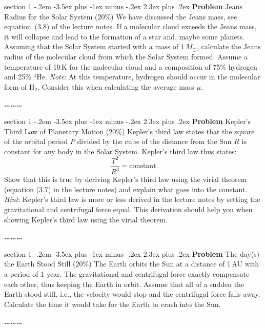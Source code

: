 \documentclass[letterpaper,12pt,twoside=false,DIV=11]{scrartcl}
\makeatletter
\newenvironment{problem}{\@startsection
    {section}
    {1}
    {-.2em}
    {-3.5ex plus -1ex minus -.2ex}
    {2.3ex plus .2ex}
    {
        \pagebreak[3] %
        \noindent\sffamily\bfseries Problem
    }
}
{
    \begin{center}\large\bfseries\ldots\ldots\ldots\end{center}
}
\providecommand{\ex}[1]{\ensuremath{^{#1}}}
\makeatother
\begin{document}
\begin{problem}{Jeans Radius for the Solar System (20\%)} 
    We have discussed the Jeans mass, see equation~(3.8) of the lecture notes. If a molecular cloud exceeds the Jeans mass, it will collapse and lead to the formation of a star and, maybe some planets. Assuming that the Solar System started with a mass of $1\,M_\odot$, calculate the Jeans radius of the molecular cloud from which the Solar System formed. Assume a temperature of 10\,K for the molecular cloud and a composition of 75\% hydrogen and 25\% \ex{4}He. \emph{Note}: At this temperature, hydrogen should occur in the molecular form of H$_2$. Consider this when calculating the average mass $\mu$.
\end{problem}

\begin{problem}{Kepler's Third Law of Planetary Motion (20\%)}
    Kepler's third law states that the square of the orbital period $P$ divided by the cube of the distance from the Sun $R$ is constant for any body in the Solar System. Kepler's third law thus states:
    \begin{equation}
        \frac{T^{2}}{R^{3}} = \mathrm{constant}
    \end{equation}
    Show that this is true by deriving Kepler's third law using the virial theorem (equation (3.7) in the lecture notes) and explain what goes into the constant. \emph{Hint}: Kepler's third law is more or less derived in the lecture notes by setting the gravitational and centrifugal force equal. This derivation should help you when showing Kepler's third law using the virial theorem.
\end{problem}


\begin{problem}{The day(s) the Earth Stood Still (20\%)}
    The Earth orbits the Sun at a distance of 1\,AU with a period of 1 year. The gravitational and centrifugal force exactly compensate each other, thus keeping the Earth in orbit. Assume that all of a sudden the Earth stood still, i.e., the velocity would stop and the centrifugal force falls away. Calculate the time it would take for the Earth to crash into the Sun.
\end{problem}
\end{document}
